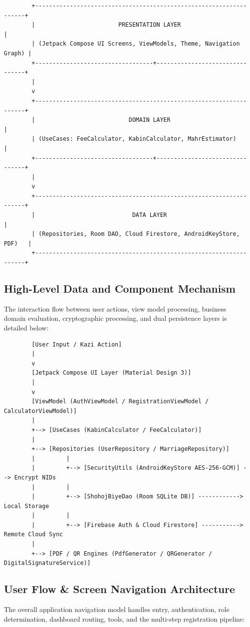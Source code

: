 \documentclass[12pt,a4paper]{article}
\begin{document}
	\begin{lstlisting}
		+-------------------------------------------------------------------+
		|                        PRESENTATION LAYER                         |
		| (Jetpack Compose UI Screens, ViewModels, Theme, Navigation Graph) |
		+----------------------------------+--------------------------------+
		|
		v
		+-------------------------------------------------------------------+
		|                           DOMAIN LAYER                            |
		| (UseCases: FeeCalculator, KabinCalculator, MahrEstimator)         |
		+----------------------------------+--------------------------------+
		|
		v
		+-------------------------------------------------------------------+
		|                            DATA LAYER                             |
		| (Repositories, Room DAO, Cloud Firestore, AndroidKeyStore, PDF)   |
		+-------------------------------------------------------------------+
	\end{lstlisting}
	
	\subsection{High-Level Data and Component Mechanism}
	The interaction flow between user actions, view model processing, business domain evaluation, cryptographic processing, and dual persistence layers is detailed below:
	
	\begin{lstlisting}
		[User Input / Kazi Action]
		|
		v
		[Jetpack Compose UI Layer (Material Design 3)]
		|
		v
		[ViewModel (AuthViewModel / RegistrationViewModel / CalculatorViewModel)]
		|
		+--> [UseCases (KabinCalculator / FeeCalculator)]
		|
		+--> [Repositories (UserRepository / MarriageRepository)]
		|         |
		|         +--> [SecurityUtils (AndroidKeyStore AES-256-GCM)] --> Encrypt NIDs
		|         |
		|         +--> [ShohojBiyeDao (Room SQLite DB)] ------------> Local Storage
		|         |
		|         +--> [Firebase Auth & Cloud Firestore] -----------> Remote Cloud Sync
		|
		+--> [PDF / QR Engines (PdfGenerator / QRGenerator / DigitalSignatureService)]
	\end{lstlisting}
	
	\subsection{User Flow \& Screen Navigation Architecture}
	The overall application navigation model handles entry, authentication, role determination, dashboard routing, tools, and the multi-step registration pipeline:
	
\end{document}
